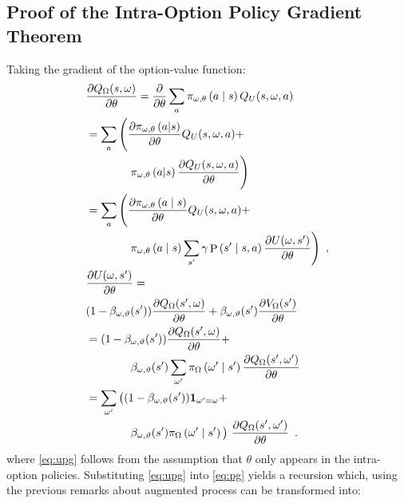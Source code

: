 \documentclass[letterpaper]{article}
\def\given{\;\middle\vert\;}
\def\indicator{\mathbf{1}}
\DeclareMathOperator{\prob}{P}
\begin{document}
\subsection*{Proof of the Intra-Option Policy Gradient Theorem}
Taking the gradient of the option-value function:
\begin{align}
&\deriv[Q_\Omega(s, \omega)]{\theta} = \deriv[]{\theta} \sum_a \pi_{\omega,\theta}\left( a \given s\right) Q_U(s,\omega, a)\notag\\
&= \sum_a \Bigg(\deriv[\pi_{\omega,\theta}\left( a | s \right)]{\theta}  Q_U(s,\omega, a) + \notag \\
&\hspace{4em}\pi_{\omega,\theta}\left(a | s\right)\deriv[Q_U(s,\omega, a)]{\theta} \Bigg) \notag \\
&= \sum_a \Bigg(\deriv[\pi_{\omega,\theta}\left( a \given s \right)]{\theta} Q_U(s,\omega, a) + \notag \\
&\hspace{4em} \pi_{\omega,\theta}\left(a \given s\right)\sum_{s^\prime} \gamma \prob\left( s^\prime \given s, a\right)\deriv[U(\omega, s')]{\theta} \Bigg) \enspace , \label{eq:pg}\\
&\deriv[U(\omega, s')]{\theta} = \notag\\
&(1 - \beta_{\omega, \vartheta}(s')) \deriv[Q_\Omega(s', \omega)]{\theta} + \beta_{\omega, \vartheta}(s')\deriv[V_\Omega(s')]{\theta} \notag \\
&= (1 - \beta_{\omega, \vartheta}(s'))\deriv[Q_\Omega(s', \omega)]{\theta} + \notag \\
&\hspace{4em}\beta_{\omega, \vartheta}(s') \sum_{\omega^\prime} \pi_\Omega \left( \omega^\prime \given s' \right)\deriv[ Q_\Omega(s', \omega^\prime)]{\theta} \notag \\
&= \sum_{\omega'}\big((1 -\beta_{\omega, \vartheta}(s'))\indicator_{\omega'=\omega} + \notag \\
&\hspace{4em}\beta_{\omega, \vartheta}(s') \pi_\Omega\left(\omega' \given s'\right)\big)\
  \deriv[Q_\Omega(s', \omega')]{\theta} \enspace .  \label{eq:upg}
\end{align}
where \eqref{eq:upg} follows from the assumption that $\theta$ only appears in the intra-option policies.
Substituting  \eqref{eq:upg} into \eqref{eq:pg} yields a recursion which, using
the previous remarks about augmented process
can be transformed into:
\end{document}
